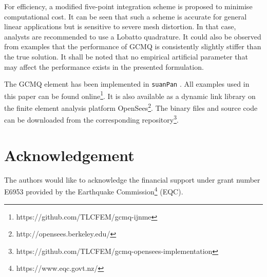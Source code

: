 \documentclass[3p,sort&compress,review,11pt]{elsarticle}
\begin{document}
For efficiency, a modified five-point integration scheme is proposed to minimise computational cost. It can be seen that such a scheme is accurate for general linear applications but is sensitive to severe mesh distortion. In that case, analysts are recommended to use a  Lobatto quadrature. It could also be observed from examples that the performance of GCMQ is consistently slightly stiffer than the true solution. It shall be noted that no empirical artificial parameter that may affect the performance exists in the presented formulation.

The GCMQ element has been implemented in \texttt{suanPan} \citep{Chang2018}. All examples used in this paper can be found online\footnote{https://github.com/TLCFEM/gcmq-ijnme}. It is also available as a dynamic link library on the finite element analysis platform OpenSees\footnote{http://opensees.berkeley.edu/}. The binary files and source code can be downloaded from the corresponding repository\footnote{https://github.com/TLCFEM/gcmq-opensees-implementation}.
\section*{Acknowledgement}
The authors would like to acknowledge the financial support under grant number E6953 provided by the Earthquake Commission\footnote{https://www.eqc.govt.nz/} (EQC).

\end{document}

